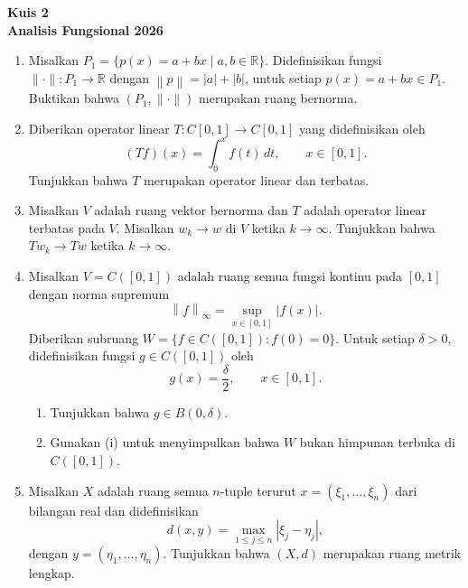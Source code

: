 \documentclass[11pt,a4paper]{article}
\newcommand{\R}{\mathbb{R}}
\newcommand{\norm}[1]{\left\lVert #1\right\rVert}
\newcommand{\supnorm}[1]{\left\lVert #1\right\rVert_\infty}
\begin{document}
\setlength{\abovedisplayskip}{6pt}
\setlength{\belowdisplayskip}{6pt}
\setlength{\abovedisplayshortskip}{4pt}
\setlength{\belowdisplayshortskip}{4pt}

\begin{center}
  \textbf{\Large Kuis 2\\[4pt]Analisis Fungsional 2026}
\end{center}
\vspace{6pt}

\begin{enumerate}
  \item Misalkan $P_1=\{p(x)=a+bx\mid a,b\in\R\}$.
        Didefinisikan fungsi $\lVert\cdot\rVert:P_1\to\R$ dengan
        $\norm{p}=|a|+|b|$, untuk setiap $p(x)=a+bx\in P_1$.
        Buktikan bahwa $(P_1,\lVert\cdot\rVert)$ merupakan ruang bernorma.

  \item Diberikan operator linear $T:C[0,1]\to C[0,1]$ yang didefinisikan oleh
        \[
          (Tf)(x)=\int_0^x f(t)\,dt,\qquad x\in[0,1].
        \]
        Tunjukkan bahwa $T$ merupakan operator linear dan terbatas.

  \item Misalkan $V$ adalah ruang vektor bernorma dan $T$ adalah operator linear
        terbatas pada $V$. Misalkan $w_k\to w$ di $V$ ketika $k\to\infty$.
        Tunjukkan bahwa $Tw_k\to Tw$ ketika $k\to\infty$.

  \item Misalkan $V=C([0,1])$ adalah ruang semua fungsi kontinu pada $[0,1]$
        dengan norma supremum
        \[
          \supnorm{f}=\sup_{x\in[0,1]}|f(x)|.
        \]
        Diberikan subruang $W=\{f\in C([0,1]):f(0)=0\}$.
        Untuk setiap $\delta>0$, didefinisikan fungsi $g\in C([0,1])$ oleh
        \[
          g(x)=\frac{\delta}{2},\qquad x\in[0,1].
        \]
        \begin{enumerate}
          \item Tunjukkan bahwa $g\in B(0,\delta)$.
          \item Gunakan (i) untuk menyimpulkan bahwa $W$ bukan himpunan terbuka
                di $C([0,1])$.
        \end{enumerate}

  \item Misalkan $X$ adalah ruang semua $n$-tuple terurut
        $x=(\xi_1,\ldots,\xi_n)$ dari bilangan real dan didefinisikan
        \[
          d(x,y)=\max_{1\le j\le n}|\xi_j-\eta_j|,
        \]
        dengan $y=(\eta_1,\ldots,\eta_n)$.
        Tunjukkan bahwa $(X,d)$ merupakan ruang metrik lengkap.


\end{enumerate}
\end{document}
